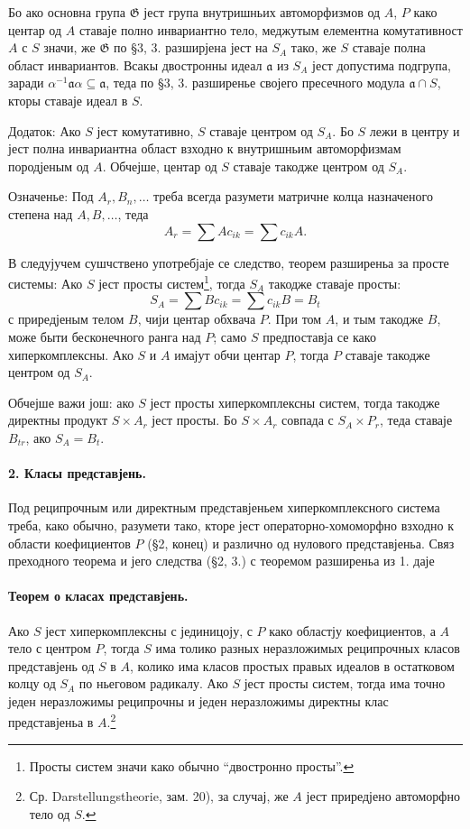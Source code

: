 ﻿\documentclass[11pt]{article}
\newcommand{\foreign}[1]{#1}
\providecommand{\frG}{\mathfrak G}
\providecommand{\glqq}{``}
\providecommand{\grqq}{''}
\begin{document}
Бо ако основна група \(\frG\) јест група внутришньих автоморфизмов од \(A\), \(P\) како центар од \(A\) ставаје полно инвариантно тело, меджутым елементна комутативност \(A\) с \(S\) значи, же \(\frG\) по §3, 3. разширјена јест на \(S_A\) тако, же \(S\) ставаје полна област инвариантов. Всакы двостронны идеал \(\mathfrak a\) из \(S_A\) јест допустима подгрупа, заради \(\alpha^{-1}\mathfrak a\alpha\subseteq\mathfrak a\), теда по §3, 3. разширенье својего пресечного модула \(\mathfrak a\cap S\), кторы ставаје идеал в \(S\).

Додаток: Ако \(S\) јест комутативно, \(S\) ставаје центром од \(S_A\). Бо \(S\) лежи в центру и јест полна инвариантна област взходно к внутришньим автоморфизмам породјеным од \(A\). Обчејше, центар од \(S\) ставаје такодже центром од \(S_A\).

Означенье: Под \(A_r,B_n,\ldots\) треба всегда разумети матричне колца назначеного степена над \(A,B,\ldots\), теда
\[
        A_r=\sum A c_{ik}=\sum c_{ik}A.
\]

В следујучем сушчствено употребјаје се следство, теорем разширеньа за просте системы: Ако \(S\) јест просты систем\footnote{Просты систем значи како обычно \glqq{}двостронно просты\grqq{}.}, тогда \(S_A\) такодже ставаје просты:
\[
        S_A=\sum B c_{ik}=\sum c_{ik}B=B_t
\]
с приредјеным телом \(B\), чији центар обхвача \(P\). При том \(A\), и тым такодже \(B\), може быти бесконечного ранга над \(P\); само \(S\) предпоставја се како хиперкомплексны. Ако \(S\) и \(A\) имајут обчи центар \(P\), тогда \(P\) ставаје такодже центром од \(S_A\).

Обчејше важи још: ако \(S\) јест просты хиперкомплексны систем, тогда такодже директны продукт \(S\times A_r\) јест просты. Бо \(S\times A_r\) совпада с \(S_A\times P_r\), теда ставаје \(B_{tr}\), ако \(S_A=B_t\).

\paragraph{2. Класы представјень.}
Под реципрочным или директным представјеньем хиперкомплексного система треба, како обычно, разумети тако, кторе јест операторно-хомоморфно взходно к области коефициентов \(P\) (§2, конец) и различно од нулового представјеньа. Связ преходного теорема и јего следства (§2, 3.) с теоремом разширеньа из 1. даје

\paragraph{Теорем о класах представјень.}
Ако \(S\) јест хиперкомплексны с јединицоју, с \(P\) како областју коефициентов, а \(A\) тело с центром \(P\), тогда \(S\) има толико разных неразложимых реципрочных класов представјень од \(S\) в \(A\), колико има класов простых правых идеалов в остатковом колцу од \(S_A\) по ньеговом радикалу. Ако \(S\) јест просты систем, тогда има точно једен неразложимы реципрочны и једен неразложимы директны клас представјеньа в \(A\).\footnote{Ср. \foreign{Darstellungstheorie}, зам. 20), за случај, же \(A\) јест приредјено автоморфно тело од \(S\).}
\end{document}
